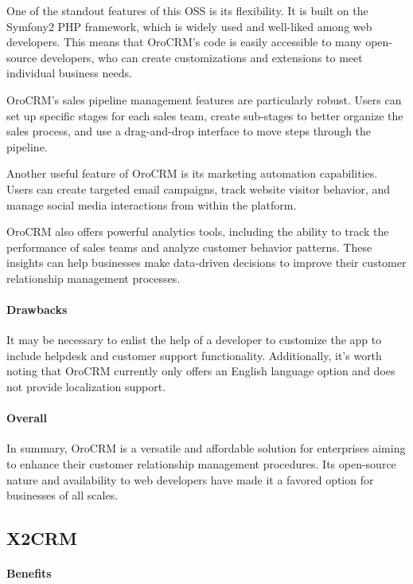 \documentclass{article}
\begin{document}
One of the standout features of this OSS is its flexibility. It is built on the Symfony2 PHP framework, which is widely used and well-liked among web developers. This means that OroCRM's code is easily accessible to many open-source developers, who can create customizations and extensions to meet individual business needs.

OroCRM's sales pipeline management features are particularly robust. Users can set up specific stages for each sales team, create sub-stages to better organize the sales process, and use a drag-and-drop interface to move steps through the pipeline.

Another useful feature of OroCRM is its marketing automation capabilities. Users can create targeted email campaigns, track website visitor behavior, and manage social media interactions from within the platform.

OroCRM also offers powerful analytics tools, including the ability to track the performance of sales teams and analyze customer behavior patterns. These insights can help businesses make data-driven decisions to improve their customer relationship management processes.

\paragraph{Drawbacks}

It may be necessary to enlist the help of a developer to customize the app to include helpdesk and customer support functionality. Additionally, it's worth noting that OroCRM currently only offers an English language option and does not provide localization support.

\paragraph{Overall}

In summary, OroCRM is a versatile and affordable solution for enterprises aiming to enhance their customer relationship management procedures. Its open-source nature and availability to web developers have made it a favored option for businesses of all scales.

\subsection{X2CRM}

\paragraph{Benefits}
\end{document}
